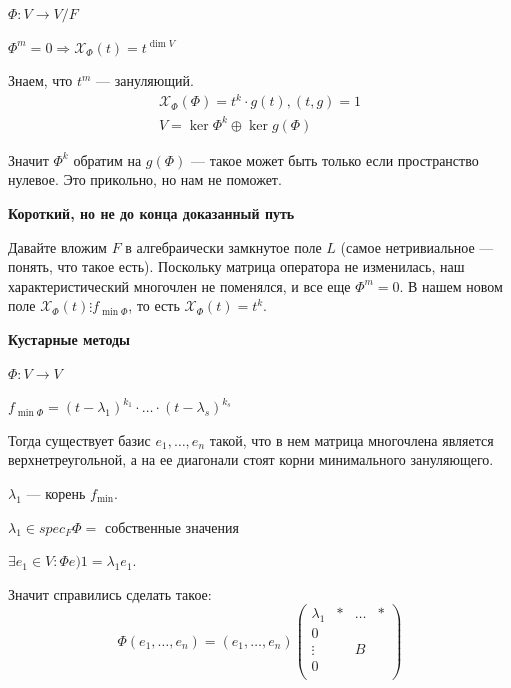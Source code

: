 \begin{lemma}{}{}
    \( \Phi : V \to V / F \)

    \( \Phi^m = 0 \Rightarrow \mathcal{X}_{\Phi}(t) = t^{\dim V} \)
\end{lemma}

Знаем, что \( t^m \) --- зануляющий.
\begin{gather*}
    \mathcal{X}_{\Phi} (\Phi) = t^k \cdot g(t), (t, g) = 1
    \\
    V = \ker \Phi^k \oplus \ker g(\Phi)
\end{gather*}

Значит \( \Phi^k \) обратим на \( g(\Phi) \) --- такое может быть только если пространство нулевое.
Это прикольно, но нам не поможет.

\textbf{Короткий, но не до конца доказанный путь}

Давайте вложим \( F \) в алгебраически замкнутое поле \( L \) (самое нетривиальное --- понять, что такое есть).
Поскольку матрица оператора не изменилась, наш характеристический многочлен не поменялся,
и все еще \( \Phi^m = 0 \). В нашем новом поле \( \mathcal{X}_{\Phi} (t) \vdots f_{\min \Phi} \),
то есть \( \mathcal{X}_{\Phi} (t) = t^k \).

\textbf{Кустарные методы}

\begin{lemma}{}{}
    \( \Phi : V \to V \)

    \( f_{\min \Phi} = (t - \lambda_1)^{k_1} \cdot \ldots \cdot (t - \lambda_s)^{k_s} \)

    Тогда существует базис \( e_1, \ldots, e_n \) такой,
    что в нем матрица многочлена является верхнетреугольной,
    а на ее диагонали стоят корни минимального зануляющего.
\end{lemma}

\( \lambda_1 \) --- корень \( f_{\min} \).

\( \lambda_1 \in spec_F \Phi = \) собственные значения

\( \exists e_1 \in V : \Phi e)1 = \lambda_1 e_1 \).

Значит справились сделать такое:
\[
    \Phi (e_1, \ldots, e_n) = (e_1, \ldots, e_n)
    \begin{pmatrix}
        \lambda_1 & * & \ldots & *
        \\
        0 & \ & \ & \
        \\
        \vdots & \ & B & \
        \\
        0 & \ & \ & \
        \\
    \end{pmatrix}
\]

